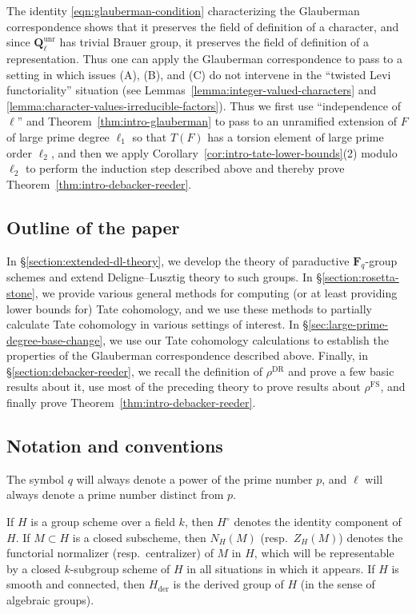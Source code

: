 \documentclass[reqno]{amsart}
\numberwithin{equation}{subsection}
\newcommand{\F}{\mathbf{F}}
\newcommand{\Q}{\mathbf{Q}}
\DeclareMathOperator{\unr}{unr}
\DeclareMathOperator{\FS}{FS}
\DeclareMathOperator{\der}{der}
\DeclareMathOperator{\DR}{DR}
\theoremstyle{remark}
\numberwithin{equation}{subsection}
\numberwithin{figure}{subsection}
\begin{document}
The identity \eqref{eqn:glauberman-condition} characterizing the Glauberman correspondence shows that it preserves the field of definition of a character, and since $\Q_\ell^{\unr}$ has trivial Brauer group, it preserves the field of definition of a representation. Thus one can apply the Glauberman correspondence to pass to a setting in which issues (A), (B), and (C) do not intervene in the ``twisted Levi functoriality'' situation (see Lemmas~\ref{lemma:integer-valued-characters} and \ref{lemma:character-values-irreducible-factors}). Thus we first use ``independence of $\ell$'' \cite[Theorem~1.1]{Sch25} and Theorem~\ref{thm:intro-glauberman} to pass to an unramified extension of $F$ of large prime degree $\ell_1$ so that $T(F)$ has a torsion element of large prime order $\ell_2$, and then we apply Corollary~\ref{cor:intro-tate-lower-bounds}(2) modulo $\ell_2$ to perform the induction step described above and thereby prove Theorem~\ref{thm:intro-debacker-reeder}.

\subsection{Outline of the paper}

In \S\ref{section:extended-dl-theory}, we develop the theory of paraductive $\F_q$-group schemes and extend Deligne--Lusztig theory to such groups. In \S\ref{section:rosetta-stone}, we provide various general methods for computing (or at least providing lower bounds for) Tate cohomology, and we use these methods to partially calculate Tate cohomology in various settings of interest. In \S\ref{sec:large-prime-degree-base-change}, we use our Tate cohomology calculations to establish the properties of the Glauberman correspondence described above. Finally, in \S\ref{section:debacker-reeder}, we recall the definition of $\rho^{\DR}$ and prove a few basic results about it, use most of the preceding theory to prove results about $\rho^{\FS}$, and finally prove Theorem~\ref{thm:intro-debacker-reeder}.

\subsection{Notation and conventions}

The symbol $q$ will always denote a power of the prime number $p$, and $\ell$ will always denote a prime number distinct from $p$.

If $H$ is a group scheme over a field $k$, then $H^\circ$ denotes the identity component of $H$. If $M \subset H$ is a closed subscheme, then $N_H(M)$ (resp.\ $Z_H(M)$) denotes the functorial normalizer (resp.\ centralizer) of $M$ in $H$, which will be representable by a closed $k$-subgroup scheme of $H$ in all situations in which it appears. If $H$ is smooth and connected, then $H_{\der}$ is the derived group of $H$ (in the sense of algebraic groups).
\end{document}
